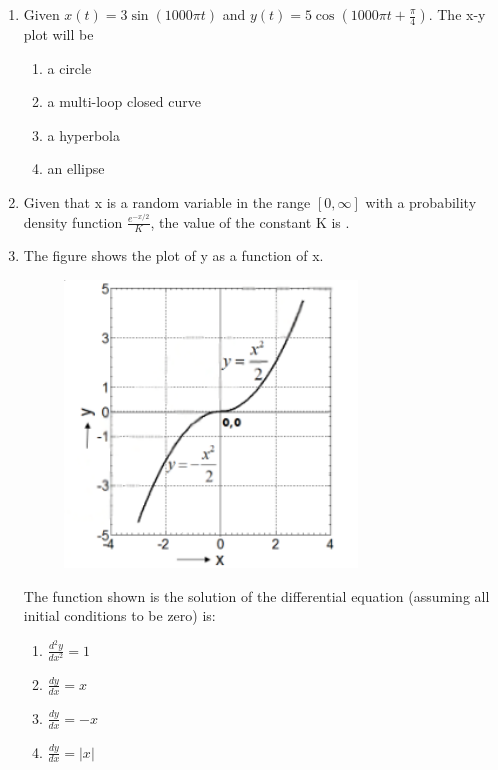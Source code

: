 \documentclass[journal,12pt,onecolumn]{IEEEtran}
\theoremstyle{remark}
\begin{document}
\begin{enumerate}
    \item Given $x(t) = 3 \sin(1000 \pi t)$ and $y(t) = 5 \cos(1000 \pi t + \frac{\pi}{4})$. The x-y plot will be
    \begin{multicols}{2}
        \begin{enumerate}
            \item a circle
            \item a multi-loop closed curve
            \item a hyperbola
            \item an ellipse
        \end{enumerate}
    \end{multicols}
    
    \item Given that x is a random variable in the range $[0, \infty]$ with a probability density function $\frac{e^{-x/2}}{K}$, the value of the constant K is \underline{\hspace{2cm}}.

    \vspace{0.5cm}
    
    \item The figure shows the plot of y as a function of x.
    \begin{figure}[H]
        \centering
        \includegraphics[width=0.5\columnwidth]{q3}
        \caption*{}
        \label{fig:placeholder}
    \end{figure}
    The function shown is the solution of the differential equation (assuming all initial conditions to be zero) is:
    \begin{multicols}{2}
        \begin{enumerate}
            \item $\frac{d^2y}{dx^2} = 1$
            \item $\frac{dy}{dx} = x$
            \item $\frac{dy}{dx} = -x$
            \item $\frac{dy}{dx} = |x|$
        \end{enumerate}
    \end{multicols}


\end{enumerate}
\end{document}
